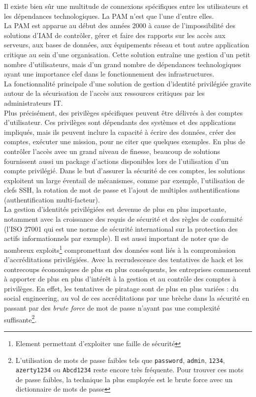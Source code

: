 Il existe bien sûr une multitude de connexions spécifiques entre les utilisateurs et les dépendances technologiques. La PAM n’est que l’une d’entre elles.\\
La PAM est apparue au début des années 2000 à cause de l’impossibilité des solutions d’IAM de contrôler, gérer et faire des rapports sur les accès aux serveurs, aux bases de données, aux équipements réseau et tout autre application critique au sein d’une organisation. Cette solution entraîne une gestion d’un petit nombre d’utilisateurs, mais d’un grand nombre de dépendances technologiques ayant une importance clef dans le fonctionnement des infrastructures.\\
La fonctionnalité principale d’une solution de gestion d’identité privilégiée gravite autour de la sécurisation de l’accès aux ressources critiques par les administrateurs IT.\\
Plus précisément, des privilèges spécifiques peuvent être délivrés à des comptes d’utilisateur. Ces privilèges sont dépendants des systèmes et des applications impliqués, mais ils peuvent inclure la capacité à écrire des données, créer des comptes, exécuter une mission, pour ne citer que quelques exemples. En plus de contrôler l’accès avec un grand niveau de finesse, beaucoup de solutions fournissent aussi un package d’actions disponibles lors de l’utilisation d’un compte privilégié. Dans le but d’assurer la sécurité de ces comptes, les solutions exploitent un large éventail de mécanismes, comme par exemple, l’utilisation de clefs SSH, la rotation de mot de passe et l’ajout de multiples authentifications (authentification multi-facteur).\\
La gestion d’identités privilégiées est devenue de plus en plus importante, notamment avec la croissance des requis de sécurité et des règles de conformité (l’ISO 27001 qui est une norme de sécurité international sur la protection des actifs informationnels par exemple). Il est aussi important de noter que de nombreux exploits\footnote{Element permettant d'exploiter une faille de sécurité} compromettant des données sont liés à la compromission d’accréditations privilégiées. Avec la recrudescence des tentatives de hack et les contrecoups économiques de plus en plus conséquents, les entreprises commencent à apporter de plus en plus d’intérêt à la gestion et au contrôle des comptes à privilèges. En effet, les tentatives de piratage sont de plus en plus variées : du social engineering, au vol de ces accréditations par une brèche dans la sécurité en passant par des \textit{brute force} de mot de passe n’ayant pas une complexité suffisante\footnote{L'utilisation de mots de passe faibles tels que \texttt{password}, \texttt{admin}, \texttt{1234}, \texttt{azerty1234} ou \texttt{Abcd1234} reste encore très fréquente. Pour trouver ces mots de passe faibles, la technique la plus employée est le brute force avec un dictionnaire de mots de passe}.\\
